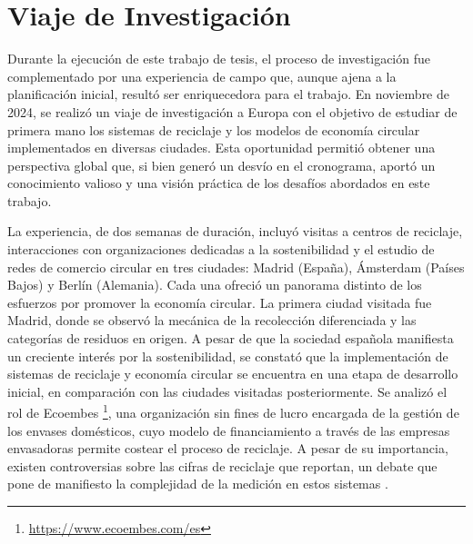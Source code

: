\chapter{Viaje de Investigación}
\label{cp:europe-trip}

Durante la ejecución de este trabajo de tesis, el proceso de investigación fue complementado por una experiencia de campo que, aunque ajena a la planificación inicial, resultó ser enriquecedora para el trabajo. En noviembre de 2024, se realizó un viaje de investigación a Europa con el objetivo de estudiar de primera mano los sistemas de reciclaje y los modelos de economía circular implementados en diversas ciudades. Esta oportunidad permitió obtener una perspectiva global que, si bien generó un desvío en el cronograma, aportó un conocimiento valioso y una visión práctica de los desafíos abordados en este trabajo.

La experiencia, de dos semanas de duración, incluyó visitas a centros de reciclaje, interacciones con organizaciones dedicadas a la sostenibilidad y el estudio de redes de comercio circular en tres ciudades: Madrid (España), Ámsterdam (Países Bajos) y Berlín (Alemania). Cada una ofreció un panorama distinto de los esfuerzos por promover la economía circular. La primera ciudad visitada fue Madrid, donde se observó la mecánica de la recolección diferenciada y las categorías de residuos en origen. A pesar de que la sociedad española manifiesta un creciente interés por la sostenibilidad, se constató que la implementación de sistemas de reciclaje y economía circular se encuentra en una etapa de desarrollo inicial, en comparación con las ciudades visitadas posteriormente. Se analizó el rol de Ecoembes \footnote{\url{https://www.ecoembes.com/es}}, una organización sin fines de lucro encargada de la gestión de los envases domésticos, cuyo modelo de financiamiento a través de las empresas envasadoras permite costear el proceso de reciclaje. A pesar de su importancia, existen controversias sobre las cifras de reciclaje que reportan, un debate que pone de manifiesto la complejidad de la medición en estos sistemas \cite{pending}.

